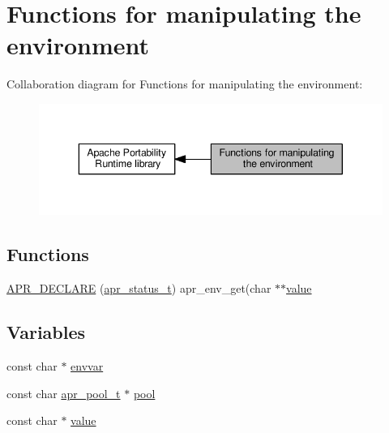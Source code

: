\hypertarget{group__apr__env}{}\section{Functions for manipulating the environment}
\label{group__apr__env}
Collaboration diagram for Functions for manipulating the environment\+:
\nopagebreak
\begin{figure}[H]
\begin{center}
\leavevmode
\includegraphics[width=343pt]{group__apr__env}
\end{center}
\end{figure}
\subsection*{Functions}
\begin{DoxyCompactItemize}
\item 
\hyperlink{group__apr__env_ga1fcd8910132f21f9fdee5797ebefa9d1}{A\+P\+R\+\_\+\+D\+E\+C\+L\+A\+RE} (\hyperlink{group__apr__errno_gaa5105fa83cc322f09382292db8b47593}{apr\+\_\+status\+\_\+t}) apr\+\_\+env\+\_\+get(char $\ast$$\ast$\hyperlink{pcretest_8txt_a262ad32c75be9b93a7a77b045ed14fe0}{value}
\end{DoxyCompactItemize}
\subsection*{Variables}
\begin{DoxyCompactItemize}
\item 
const char $\ast$ \hyperlink{group__apr__env_ga933fca1db5dfcd5330db8ef170f35d4b}{envvar}
\item 
const char \hyperlink{structapr__pool__t}{apr\+\_\+pool\+\_\+t} $\ast$ \hyperlink{group__apr__env_ga35230907c170df5d4d7f0ca99274c574}{pool}
\item 
const char $\ast$ \hyperlink{group__apr__env_ga711ebc0efad43aba10f32ded4a28cf17}{value}
\end{DoxyCompactItemize}


